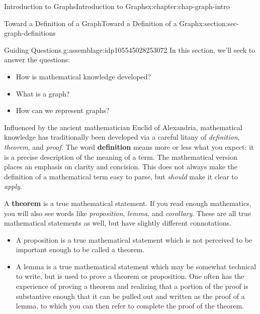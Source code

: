 \documentclass[oneside,10pt,]{book}
\newcommand{\terminology}[1]{\textbf{#1}}
\begin{document}
%
%
\typeout{************************************************}
\typeout{************************************************}
%
\begin{chapterptx}{Introduction to Graphs}{}{Introduction to Graphs}{}{}{x:chapter:chap-graph-intro}
%
%
\typeout{************************************************}
\typeout{************************************************}
%
\begin{sectionptx}{Toward a Definition of a Graph}{}{Toward a Definition of a Graph}{}{}{x:section:sec-graph-definitions}
\begin{assemblage}{Guiding Questions.}{g:assemblage:idp105545028253072}%
In this section, we'll seek to answer the questions: %
\begin{itemize}[label=\textbullet]
\item{}How is mathematical knowledge developed?%
\item{}What is a graph?%
\item{}How can we represent graphs?%
\end{itemize}
%
\end{assemblage}
\begin{introduction}{}%
Influenced by the ancient mathematician Euclid of Alexandria, mathematical knowledge has traditionally been developed via a careful litany of \emph{definition}, \emph{theorem}, and \emph{proof}. The word \terminology{definition} means more or less what you expect: it is a precise description of the meaning of a term. The mathematical version places an emphasis on clarity and concision. This does not always make the definition of a mathematical term easy to parse, but \emph{should} make it clear to \emph{apply}.%
\par
A \terminology{theorem} is a true mathematical statement. If you read enough mathematics, you will also see words like \emph{proposition}, \emph{lemma}, and \emph{corollary}. These are all true mathematical statements as well, but have slightly different connotations.%
\begin{itemize}[label=\textbullet]
\item{}A proposition is a true mathematical statement which is not perceived to be important enough to be called a theorem.%
\item{}A lemma is a true mathematical statement which may be somewhat technical to write, but is used to prove a theorem or proposition. One often has the experience of proving a theorem and realizing that a portion of the proof is substantive enough that it can be pulled out and written as the proof of a lemma, to which you can then refer to complete the proof of the theorem.%

\end{itemize}
\end{introduction}
\end{sectionptx}
\end{chapterptx}
\end{document}
